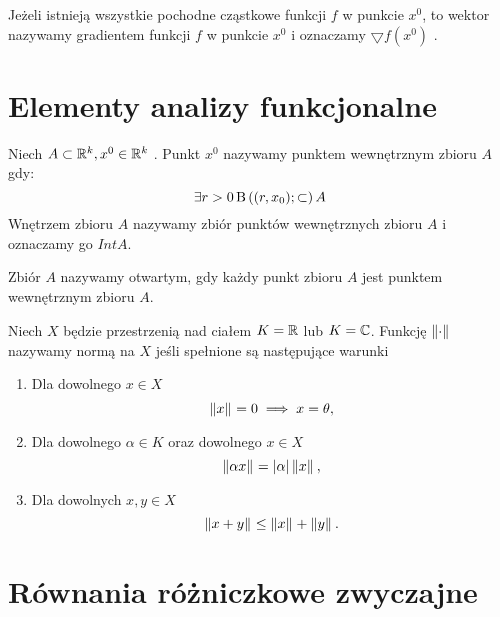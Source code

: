 \documentclass[12pt,a4paper]{report}
\begin{document}
\begin{definition} 
Jeżeli istnieją wszystkie pochodne cząstkowe funkcji $f$ w punkcie $x^0$, to wektor 
\begin{equation}
[\ddx{x_1}f_{x_{1}}(x_0), \cdots, \ddx{x_k}f_{x_{k}}(x_0)]
\end{equation}
 nazywamy gradientem funkcji $f$ w punkcie $x^0$ i oznaczamy $\bigtriangledown f(x^0)$ .
\end{definition}


\section{Elementy analizy funkcjonalne}

\begin{definition} 
Niech $A \subset \mathbb{R}^k, x^0 \in \mathbb{R}^k$ . Punkt $x^0$ nazywamy punktem wewnętrznym zbioru $A$ gdy:
$$
\exists  r>0    \ball{(r,x_0)} \subset A
$$
Wnętrzem zbioru $A$ nazywamy zbiór punktów wewnętrznych zbioru $A$ i oznaczamy go $IntA$.
\end{definition}

\begin{definition}  
Zbiór $A$ nazywamy otwartym, gdy każdy punkt zbioru $A$ jest punktem wewnętrznym zbioru $A$. 
\end{definition}

\begin{definition} [Norma]
Niech $X$ będzie przestrzenią nad ciałem $K =\mathbb{R} $ lub $ K = \mathbb{C} $. Funkcję $\left\| {\cdot} \right\|_{}$ nazywamy normą na $X$ jeśli spełnione są następujące warunki 
\begin{enumerate}
\item Dla dowolnego $x\in X$
$$
 \left\| {x} \right\|_{} = 0 \implies x = \theta,
$$
\item Dla dowolnego $\alpha \in K$ oraz dowolnego $x \in X$ 
$$
\left\| {\alpha x} \right\|_{}  = {\left| {\alpha} \right|}  \left\| {x} \right\|_{},
$$
\item Dla dowolnych $x,y\in X$
$$
 \left\| {x+y} \right\|_{} \leq \left\| {x} \right\|_{} + \left\| {y} \right\|_{}.
$$
\end{enumerate}

\end{definition}

\section{Równania różniczkowe zwyczajne}
\end{document}

